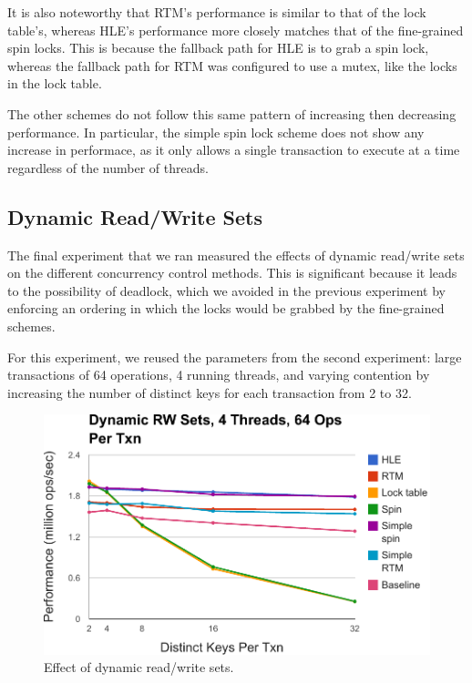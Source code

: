 It is also noteworthy that RTM's performance is similar to that of the lock
table's, whereas HLE's performance more closely matches that of the fine-grained
spin locks.  This is because the fallback path for HLE is to grab a 
spin lock, whereas the fallback path for RTM was configured to use a 
mutex, like the locks in the lock table.

The other schemes do not follow this same pattern of increasing then decreasing
performance. In particular, the simple spin lock scheme does not show any
increase in performace, as it only allows a single transaction to execute at a
time regardless of the number of threads.

\subsection{Dynamic Read/Write Sets}

The final experiment that we ran measured the effects of dynamic read/write sets
on the different concurrency control methods. This is significant because it
leads to the possibility of deadlock, which we avoided in the previous
experiment by enforcing an ordering in which the locks would be grabbed by the
fine-grained schemes.

For this experiment, we reused the parameters from the second experiment:
large transactions of 64 operations, 4 running threads, and varying 
contention by increasing the number of distinct keys for each transaction 
from 2 to 32.

\begin{figure}[h!]
  \centering
  \includegraphics[scale=0.575]{figure/dynamic.pdf}
  \caption{Effect of dynamic read/write sets.}
  \label{fig:dynamic} 
\end{figure}


